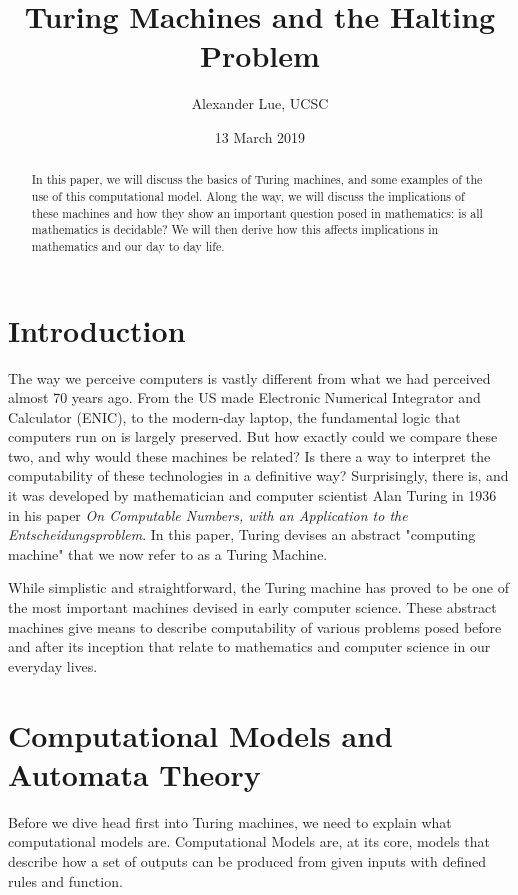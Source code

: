 \documentclass[12pt]{article}
\title{Turing Machines and the Halting Problem}
\author{Alexander Lue, UCSC}
\date{13 March 2019}
\begin{document}
\maketitle

\begin{abstract}
	In this paper, we will discuss the basics of Turing machines, and some examples of the use of this computational model. Along the way, we will discuss the implications of these machines and how they show an important question posed in mathematics: is all mathematics is decidable? We will then derive how this affects implications in mathematics and our day to day life.
\end{abstract}



\section{Introduction}

The way we perceive computers is vastly different from what we had perceived almost 70 years ago. From the US made Electronic Numerical Integrator and Calculator (ENIC), to the modern-day laptop, the fundamental logic that computers run on is largely preserved. But how exactly could we compare these two, and why would these machines be related? Is there a way to interpret the computability of these technologies in a definitive way? Surprisingly, there is, and it was developed by mathematician and computer scientist Alan Turing in 1936 in his paper \textit{On Computable Numbers, with an Application to the Entscheidungsproblem}. In this paper, Turing devises an abstract "computing machine" that we now refer to as a Turing Machine.

While simplistic and straightforward, the Turing machine has proved to be one of the most important machines devised in early computer science. These abstract machines give means to describe computability of various problems posed before and after its inception that relate to mathematics and computer science in our everyday lives.



\section{Computational Models and Automata Theory}

Before we dive head first into Turing machines, we need to explain what computational models are. Computational Models are, at its core, models that describe how a set of outputs can be produced from given inputs with defined rules and function. 
\end{document}
